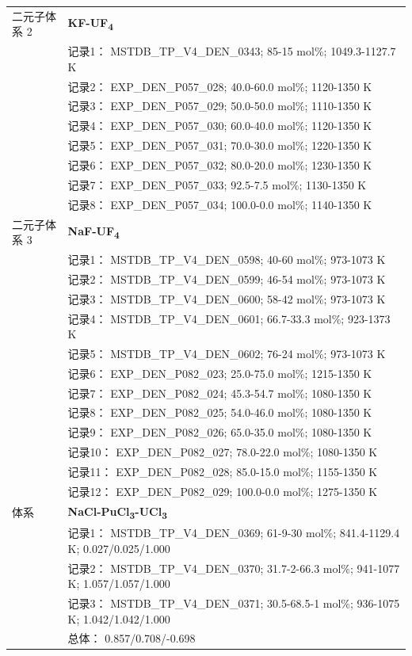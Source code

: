 \documentclass[12pt]{article}
\begin{document}
{\begin{longtable}[]{@{}
  >{\raggedright\arraybackslash}p{}
  >{\raggedright\arraybackslash}p{}@{}}
二元子体系 2  & \textbf{KF-UF\textsubscript{4}} \\
 & 记录1： MSTDB\_TP\_V4\_DEN\_0343; 85-15 mol\%; 1049.3-1127.7 K \\
 & 记录2： EXP\_DEN\_P057\_028; 40.0-60.0 mol\%; 1120-1350 K \\
 & 记录3： EXP\_DEN\_P057\_029; 50.0-50.0 mol\%; 1110-1350 K \\
 & 记录4： EXP\_DEN\_P057\_030; 60.0-40.0 mol\%; 1120-1350 K \\
 & 记录5： EXP\_DEN\_P057\_031; 70.0-30.0 mol\%; 1220-1350 K \\
 & 记录6： EXP\_DEN\_P057\_032; 80.0-20.0 mol\%; 1230-1350 K \\
 & 记录7： EXP\_DEN\_P057\_033; 92.5-7.5 mol\%; 1130-1350 K \\
 & 记录8： EXP\_DEN\_P057\_034; 100.0-0.0 mol\%; 1140-1350 K  \\

二元子体系 3  & \textbf{NaF-UF\textsubscript{4}} \\
 & 记录1： MSTDB\_TP\_V4\_DEN\_0598; 40-60 mol\%; 973-1073 K \\
 & 记录2： MSTDB\_TP\_V4\_DEN\_0599; 46-54 mol\%; 973-1073 K \\
 & 记录3： MSTDB\_TP\_V4\_DEN\_0600; 58-42 mol\%; 973-1073 K \\
 & 记录4： MSTDB\_TP\_V4\_DEN\_0601; 66.7-33.3 mol\%; 923-1373 K \\
 & 记录5： MSTDB\_TP\_V4\_DEN\_0602; 76-24 mol\%; 973-1073 K \\
 & 记录6： EXP\_DEN\_P082\_023; 25.0-75.0 mol\%; 1215-1350 K \\
 & 记录7： EXP\_DEN\_P082\_024; 45.3-54.7 mol\%; 1080-1350 K \\
 & 记录8： EXP\_DEN\_P082\_025; 54.0-46.0 mol\%; 1080-1350 K \\
 & 记录9： EXP\_DEN\_P082\_026; 65.0-35.0 mol\%; 1080-1350 K \\
 & 记录10： EXP\_DEN\_P082\_027; 78.0-22.0 mol\%; 1080-1350 K \\
 & 记录11： EXP\_DEN\_P082\_028; 85.0-15.0 mol\%; 1155-1350 K \\
 & 记录12： EXP\_DEN\_P082\_029; 100.0-0.0 mol\%; 1275-1350 K  \\

\midrule
体系 & \textbf{NaCl-PuCl\textsubscript{3}-UCl\textsubscript{3}} \\
 & 记录1： MSTDB\_TP\_V4\_DEN\_0369; 61-9-30 mol\%; 841.4-1129.4 K; 0.027/0.025/1.000 \\
 & 记录2： MSTDB\_TP\_V4\_DEN\_0370; 31.7-2-66.3 mol\%; 941-1077 K; 1.057/1.057/1.000 \\
 & 记录3： MSTDB\_TP\_V4\_DEN\_0371; 30.5-68.5-1 mol\%; 936-1075 K; 1.042/1.042/1.000 \\
 & 总体： 0.857/0.708/-0.698  \\


\end{longtable}}
\end{document}
